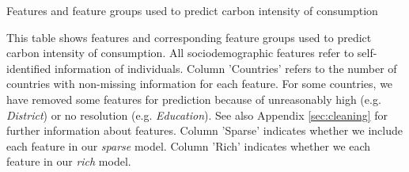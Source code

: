 \begin{table}[ht!]
\begin{adjustbox}{width=1\textwidth}
\end{adjustbox}
  \caption{Features and feature groups used to predict carbon intensity of consumption}
  \label{tab:features}

\begin{subcaption2}
This table shows features and corresponding feature groups used to predict carbon intensity of consumption. All sociodemographic features refer to self-identified information of individuals. Column 'Countries' refers to the number of countries with non-missing information for each feature. For some countries, we have removed some features for prediction because of unreasonably high (e.g. \textit{District}) or no resolution (e.g. \textit{Education}). See also Appendix \ref{sec:cleaning} for further information about features. Column 'Sparse' indicates whether we include each feature in our \textit{sparse} model. Column 'Rich' indicates whether we each feature in our \textit{rich} model.
\end{subcaption2}
\end{table}
